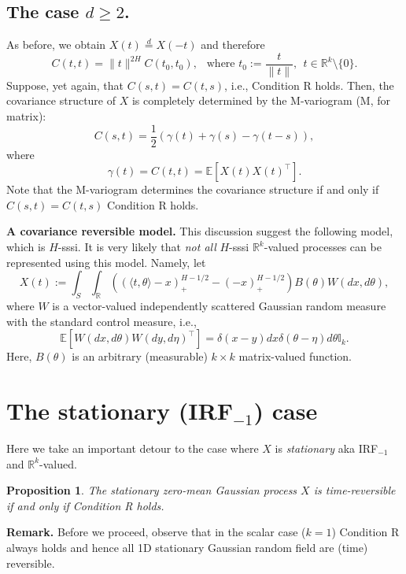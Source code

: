 \documentclass[11pt]{article}
\def\E{\mathbb E}
\def\R{\mathbb R}
\def\eqd{\stackrel{d}{=}}
\theoremstyle{plain}
\newtheorem{proposition}[theorem]{Proposition}
\theoremstyle{definition}
\theoremstyle{condition}
\theoremstyle{remark}
\begin{document}
\subsection{The case $d\ge 2$.}  As before, we obtain
$X(t) \eqd X(-t)$ and therefore 
$$
C(t,t) = \|t\|^{2H} C(t_0,t_0),\ \ \mbox{ where } t_0 := \frac{t}{\|t\|},\ \ t\in\R^k\setminus \{0\}.
$$
Suppose, yet again, that $C(s,t) = C(t,s)$, i.e., Condition R holds. Then, the covariance structure of $X$ is completely determined by the 
M-variogram (M, for matrix):
$$
C(s,t) = \frac{1}{2} \left( \gamma(t) + \gamma(s) - \gamma(t-s)  \right),
$$
where
$$
\gamma(t) = C(t,t) = \E [X(t) X(t)^\top].
$$
Note that the M-variogram determines the covariance structure if and only if $C(s,t) = C(t,s)$ Condition R holds.

\medskip
\noindent
{\bf A covariance reversible model.} This discussion suggest the following model, which is $H$-sssi.  It is very likely that {\em not all} $H$-sssi
$\R^k$-valued processes can be represented using this model.  Namely, let
$$
X(t) := \int_{S} \int_{\R} \left( (\langle t,\theta\rangle -x)_+^{H-1/2} - (-x)_+^{H-1/2} \right) B(\theta) W(dx,d\theta),
$$
where $W$ is a vector-valued independently scattered Gaussian random measure with the standard control measure, i.e.,
$$
\E [W (dx,d\theta) W(dy,d\eta)^\top ] = \delta(x-y)dx \delta(\theta-\eta) d\theta {\mathbb I}_k. 
$$
Here, $B(\theta)$ is an arbitrary (measurable) $k\times k$ matrix-valued function.

\section{The stationary (IRF$_{-1}$) case}

Here we take an important detour to the case where $X$ is {\em stationary} aka IRF$_{-1}$  and $\R^k$-valued.

\begin{proposition}\label{p:trev} The stationary zero-mean Gaussian process $X$ is time-reversible if and only if Condition R holds. 
\end{proposition}

{\bf Remark.} Before we proceed, observe that in the scalar case ($k=1$) Condition R always holds and hence all 1D stationary Gaussian random field are (time) reversible.
\end{document}
